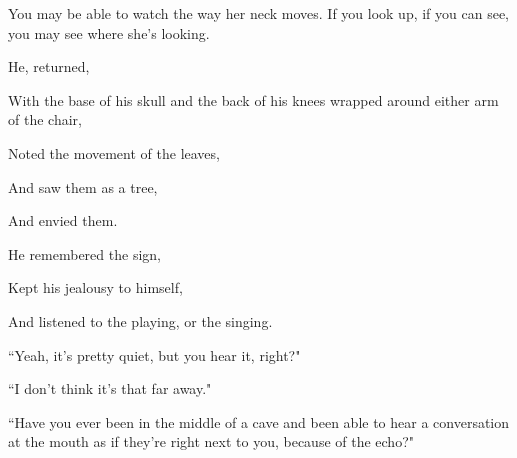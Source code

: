 \documentclass[11pt]{article}
\begin{document}
\vspace*{2\baselineskip}

\begingroup
You may be able to watch the way her neck moves. If you look up, if you can see, you may see where she's looking.
\endgroup

\vspace*{2\baselineskip}

\begingroup
\begin{center}
He, returned,
\end{center}
\endgroup

\begingroup
\begin{center}
With the base of his skull and the back of his knees wrapped around either arm of the chair,
\end{center}
\endgroup

\begingroup
\begin{center}
Noted the movement of the leaves,
\end{center}
\endgroup

\begingroup
\begin{center}
And saw them as a tree,
\end{center}
\endgroup

\begingroup
\begin{center}
And envied them.
\end{center}
\endgroup

\begingroup
\begin{center}
He remembered the sign,
\end{center}
\endgroup

\begingroup
\begin{center}
Kept his jealousy to himself,
\end{center}
\endgroup

\begingroup
\begin{center}
And listened to the playing, or the singing.
\end{center}
\endgroup

\vspace*{2\baselineskip}

\begingroup
\begin{center}
``Yeah, it's pretty quiet, but you hear it, right?"
\end{center}
\endgroup

\begingroup
\begin{center}
``I don't think it's that far away."
\end{center}
\endgroup

\begingroup
\begin{center}
``Have you ever been in the middle of a cave and been able to hear a conversation at the mouth as if they're right next to you, because of the echo?"
\end{center}
\endgroup
\end{document}
